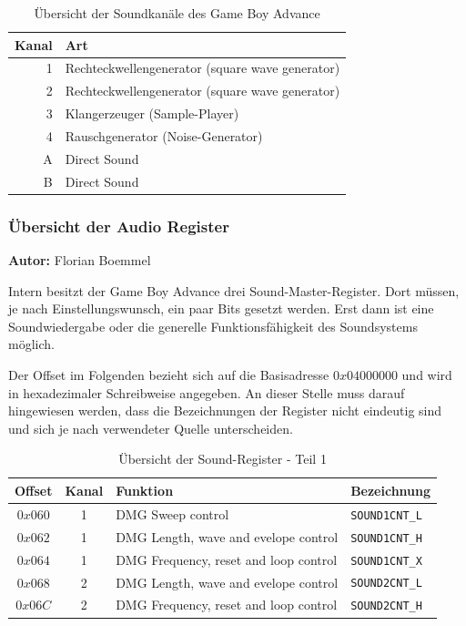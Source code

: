 \documentclass[11pt,a4paper]{scrartcl}
\newcommand{\AutorFlorian} {
    \vspace{-4mm}
    \large \textbf{Autor:} Florian Boemmel \normalsize
    \vspace{2mm}
}
\begin{document}
\begin{table}[h]
    \centering
    \begin{tabular}{ r | p{10cm} }
        \textbf{Kanal} & \textbf{Art} \\
        \hline
        1 & Rechteckwellengenerator (square wave generator) \\
        \hline
        2 & Rechteckwellengenerator (square wave generator) \\
        \hline
        3 & Klangerzeuger (Sample-Player) \\
        \hline
        4 & Rauschgenerator (Noise-Generator) \\
        \hline
        A & Direct Sound \\
        \hline
        B & Direct Sound \\
    \end{tabular}
    \caption{\"Ubersicht der Soundkan\"ale des Game Boy Advance}
    \label{table:TechnischeDaten}
\end{table}


\subsubsection{\"Ubersicht der Audio Register}
\AutorFlorian

Intern besitzt der Game Boy Advance drei Sound-Master-Register. Dort m\"ussen, je nach Einstellungswunsch, ein paar Bits gesetzt werden. Erst dann ist eine Soundwiedergabe oder die generelle Funktionsf\"ahigkeit des Soundsystems m\"oglich. \cite{GameBoySoundsystem}

Der Offset im Folgenden bezieht sich auf die Basisadresse $0x04000000$ und wird in hexadezimaler Schreibweise angegeben. An dieser Stelle muss darauf hingewiesen werden, dass die Bezeichnungen der Register nicht eindeutig sind und sich je nach verwendeter Quelle unterscheiden.

\begin{table}[h]
    \centering
    \begin{tabular}{ c | c | p{10cm} | l }
        \textbf{Offset} & \textbf{Kanal} & \textbf{Funktion} & \textbf{Bezeichnung} \\
        \hline
        $0x060$ & 1 & DMG Sweep control & \verb|SOUND1CNT_L| \\
        \hline
        $0x062$ & 1 & DMG Length, wave and evelope control & \verb|SOUND1CNT_H| \\
        \hline
        $0x064$ & 1 & DMG Frequency, reset and loop control & \verb|SOUND1CNT_X| \\
        \hline
        $0x068$ & 2 & DMG Length, wave and evelope control & \verb|SOUND2CNT_L| \\
        \hline
        $0x06C$ & 2 & DMG Frequency, reset and loop control & \verb|SOUND2CNT_H| \\
    \end{tabular}
    \caption{\"Ubersicht der Sound-Register - Teil 1}
    \label{table:SoundRegister1}
\end{table}
\end{document}

